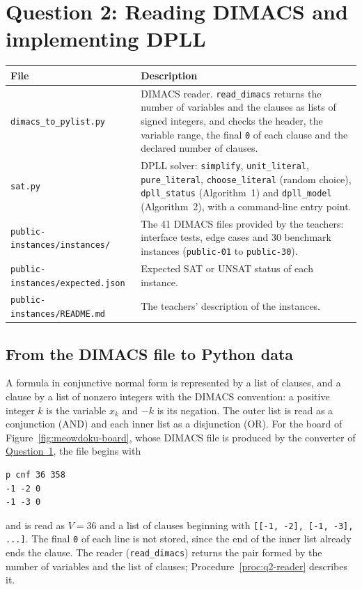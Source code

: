 \section{Question 2: Reading DIMACS and implementing DPLL}\label{sec:q2}

\begin{center}
\begin{tabular}{@{}p{6.2cm}p{10cm}@{}}
\toprule
File & Description\\
\midrule
\texttt{dimacs\_to\_pylist.py} & DIMACS reader. \texttt{read\_dimacs} returns the number of variables and the clauses as lists of signed integers, and checks the header, the variable range, the final \texttt{0} of each clause and the declared number of clauses.\\
\texttt{sat.py} & DPLL solver: \texttt{simplify}, \texttt{unit\_literal}, \texttt{pure\_literal}, \texttt{choose\_literal} (random choice), \texttt{dpll\_status} (Algorithm~1) and \texttt{dpll\_model} (Algorithm~2), with a command-line entry point.\\
\texttt{public-instances/instances/} & The 41 DIMACS files provided by the teachers: interface tests, edge cases and 30 benchmark instances (\texttt{public-01} to \texttt{public-30}).\\
\texttt{public-instances/expected.json} & Expected SAT or UNSAT status of each instance.\\
\texttt{public-instances/README.md} & The teachers' description of the instances.\\
\bottomrule
\end{tabular}
\end{center}

\subsection{From the DIMACS file to Python data}

A formula in conjunctive normal form is represented by a list of clauses, and a clause by a list of nonzero integers with the DIMACS convention: a positive integer $k$ is the variable $x_k$ and $-k$ is its negation. The outer list is read as a conjunction (AND) and each inner list as a disjunction (OR). For the board of Figure~\ref{fig:meowdoku-board}, whose DIMACS file is produced by the converter of \hyperref[sec:q1]{Question~1}, the file begins with
\begin{verbatim}
p cnf 36 358
-1 -2 0
-1 -3 0
\end{verbatim}
and is read as $V=36$ and a list of clauses beginning with \texttt{[[-1, -2], [-1, -3], ...]}. The final \texttt{0} of each line is not stored, since the end of the inner list already ends the clause. The reader (\texttt{read\_dimacs}) returns the pair formed by the number of variables and the list of clauses; Procedure~\ref{proc:q2-reader} describes it.


